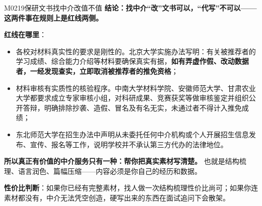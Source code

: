 \begin{qa}{M0219}{保研文书找中介改值不值}
\textbf{结论：找中介“改”文书可以，“代写”不可以——这两件事在规则上是红线两侧。}

\textbf{红线在哪里}：
\begin{itemize}
  \item 各校对材料真实性的要求是刚性的。北京大学实施办法写明：有关被推荐者的学习成绩、综合能力介绍等材料要确保真实有据，\textbf{如有弄虚作假、改动数据者，一经发现查实，立即取消被推荐者的推免资格}；
  \item 材料审核有实质性的核验程序。中南大学材料学院、安徽师范大学、甘肃农业大学都要求成立专家审核小组，对科研成果、竞赛获奖等做审核鉴定并组织公开答辩，明确排除抄袭、造假、冒名及有名无实，未通过者不得计入推免成绩；
  \item 东北师范大学在招生办法中声明从未委托任何中介机构或个人开展招生信息发布、宣传、报名等工作，说明学校并不承认第三方代办的法律地位。
\end{itemize}

\textbf{所以真正有价值的中介服务只有一种：帮你把真实素材写清楚。} 也就是结构梳理、语言润色、篇幅压缩——内容必须是你自己的经历和数据。

\textbf{性价比判断}：如果你已经有完整素材，找人做一次结构梳理性价比尚可；如果你连素材都没有，中介无法凭空创造，硬写出来的东西在面试追问下会散架。
\end{qa}

